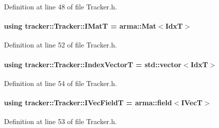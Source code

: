 Definition at line 48 of file Tracker.\+h.

\paragraph[{\texorpdfstring{I\+MatT}{IMatT}}]{\setlength{\rightskip}{0pt plus 5cm}using {\bf tracker\+::\+Tracker\+::\+I\+MatT} =  arma\+::\+Mat$<${\bf IdxT}$>$\hspace{0.3cm}{\ttfamily [inherited]}}\hypertarget{classtracker_1_1Tracker_a6de023cd3b5466996624c7e1b7e5d551}{}\label{classtracker_1_1Tracker_a6de023cd3b5466996624c7e1b7e5d551}


Definition at line 52 of file Tracker.\+h.

\paragraph[{\texorpdfstring{Index\+VectorT}{IndexVectorT}}]{\setlength{\rightskip}{0pt plus 5cm}using {\bf tracker\+::\+Tracker\+::\+Index\+VectorT} =  std\+::vector$<${\bf IdxT}$>$\hspace{0.3cm}{\ttfamily [inherited]}}\hypertarget{classtracker_1_1Tracker_a50ae514521f940c08813b45f53b6ce2d}{}\label{classtracker_1_1Tracker_a50ae514521f940c08813b45f53b6ce2d}


Definition at line 54 of file Tracker.\+h.

\paragraph[{\texorpdfstring{I\+Vec\+FieldT}{IVecFieldT}}]{\setlength{\rightskip}{0pt plus 5cm}using {\bf tracker\+::\+Tracker\+::\+I\+Vec\+FieldT} =  arma\+::field$<${\bf I\+VecT}$>$\hspace{0.3cm}{\ttfamily [inherited]}}\hypertarget{classtracker_1_1Tracker_a122e1d351fcb4444aec9729cf7625322}{}\label{classtracker_1_1Tracker_a122e1d351fcb4444aec9729cf7625322}


Definition at line 53 of file Tracker.\+h.

